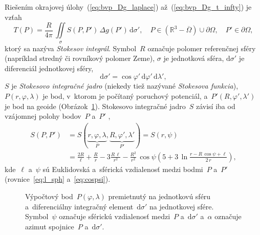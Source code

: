 \documentclass[a4paper, 12pt]{book}
\newcommand{\diff}{\mathrm d}
\begin{document}
Riešením okrajovej úlohy~(\ref{eq:bvp_Dg_laplace}) až~(\ref{eq:bvp_Dg_t_infty}) 
je vzťah
%
\begin{equation}
\label{eq:stokes}
T(P) = \frac{R}{4\pi} \, \iint\limits_{\sigma} S(P, P') \, \Delta g(P') \, 
\diff \sigma'{,} \quad P \in \left( \mathbb{R}^3 - \overline\Omega \right) \cup 
\partial\Omega{,} \quad P' \in \partial\Omega{,}
\end{equation}
%
ktorý sa nazýva \emph{Stokesov integrál}.  Symbol~$R$ označuje polomer 
referenčnej sféry (napríklad stredný či rovníkový polomer Zeme), $\sigma$ je 
jednotková sféra, $\diff\sigma'$ je diferenciál jednotkovej sféry,
%
\begin{equation}
\label{eq:diff_sigma}
\diff\sigma' = \cos\varphi' \, \diff\varphi' \, \diff\lambda'{,}
\end{equation}
%
$S$ je \emph{Stokesovo integračné jadro} (niekedy tiež nazývané \emph{Stokesova 
funkcia}), $P(r, \varphi, \lambda)$ je bod, v~ktorom je počítaný poruchový 
potenciál, a~$P'(R, \varphi', \lambda')$ je bod na geoide 
(Obrázok~\ref{fig:surface_integral}).  Stokesovo integračné jadro~$S$ závisí 
iba od vzájomnej polohy bodov~$P$ a~$P'$ \parencite{MoritzPhysicalGeodesy},
%
\begin{equation}
\label{eq:stokes_kernel_general}
\begin{split}
S(P, P') &= S(\underbrace{r, \varphi, \lambda}_{P}, \underbrace{R, \varphi', 
\lambda'}_{P'}) = S(r, \psi)\\
%
&= \frac{2R}{\ell} + \frac{R}{r} - 3\frac{R \, \ell}{r^2} - \frac{R^2}{r^2} \, 
\cos\psi\left( 5 + 3 \, \ln \frac{r - R \, \cos\psi + \ell}{2 \, r} \right){,}
\end{split}
\end{equation}
%
kde~$\ell$ a~$\psi$ sú Euklidovská a~sférická vzdialenosť medzi bodmi~$P$ 
a~$P'$ (rovnice~\ref{eq:l_sph} a~\ref{eq:cospsi}).

\begin{figure}[bt]
\centering

\caption{Výpočtový bod~$P(\varphi, \lambda)$ premietnutý na jednotkovú sféru 
a~diferenciálny integračný element~$\diff\sigma'$ na jednotkovej sfére.  
Symbol~$\psi$ označuje sférickú vzdialenosť medzi~$P$ a~$\diff\sigma'$ 
a~$\alpha$ označuje azimut spojnice~$P$ a~$\diff\sigma'$.}
\label{fig:surface_integral}
\end{figure}
\end{document}
